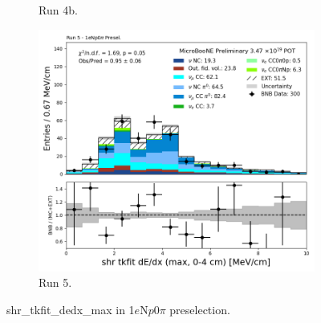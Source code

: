 \begin{figure}[H]
\begin{subfigure}[t]{0.32\linewidth}
        \caption{Run 4b.}
    \end{subfigure}%
    \hspace{0.2cm}%
    \begin{subfigure}[t]{0.32\linewidth}
        \includegraphics[width=\linewidth]{technote/Appendix_Preselection/Figures/1eNp0pi/Run5/shr_tkfit_dedx_max_Run5_1eNp0pi_Presel.png}
        \caption{Run 5.}
    \end{subfigure}
    \caption{shr\_tkfit\_dedx\_max in 1$e$N$p$0$\pi$ preselection.}
\end{figure}


